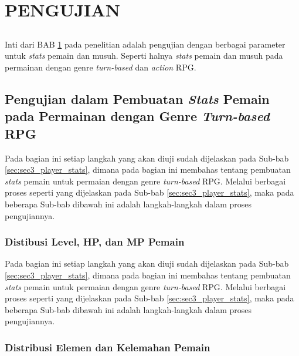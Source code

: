 \chapter{PENGUJIAN}
\label{chap:chap4_pengujian}
\vspace{1ex}

\section*{}
Inti dari BAB \ref{chap:chap4_pengujian} pada penelitian adalah pengujian dengan berbagai parameter untuk \textit{stats} pemain dan musuh. Seperti halnya \textit{stats} pemain dan musuh pada permainan dengan genre \textit{turn-based} dan \textit{action} RPG.
\vspace{1ex}

\section{Pengujian dalam Pembuatan \textit{Stats} Pemain pada Permainan dengan Genre \textit{Turn-based} RPG}
\label{sec:sec4_pengujian_turn-based_player}
\vspace{1ex}

Pada bagian ini setiap langkah yang akan diuji sudah dijelaskan pada Sub-bab \ref{sec:sec3_player_stats}, dimana pada bagian ini membahas tentang pembuatan \textit{stats} pemain untuk permaian dengan genre \textit{turn-based} RPG. Melalui berbagai proses seperti yang dijelaskan pada Sub-bab \ref{sec:sec3_player_stats}, maka pada beberapa Sub-bab dibawah ini adalah langkah-langkah dalam proses pengujiannya.
\vspace{1ex}

\subsection{Distibusi Level, HP, dan MP Pemain}
\label{sec:sub_sec4_eval_dist_hp_mp_level}
\vspace{1ex}

Pada bagian ini setiap langkah yang akan diuji sudah dijelaskan pada Sub-bab \ref{sec:sec3_player_stats}, dimana pada bagian ini membahas tentang pembuatan \textit{stats} pemain untuk permaian dengan genre \textit{turn-based} RPG. Melalui berbagai proses seperti yang dijelaskan pada Sub-bab \ref{sec:sec3_player_stats}, maka pada beberapa Sub-bab dibawah ini adalah langkah-langkah dalam proses pengujiannya.
\vspace{1ex}

\subsection{Distribusi Elemen dan Kelemahan Pemain}
\label{sec:sub_sec4_eval_weak}
\vspace{1ex}

